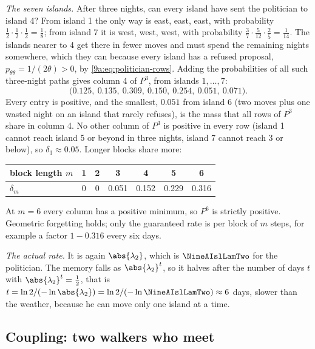 \emph{The seven islands.} After three nights, can every island have sent the politician to
island 4? From island 1 the only way is east, east, east, with probability
$\tfrac12\cdot\tfrac12\cdot\tfrac12=\tfrac18$; from island 7 it is west, west, west, with
probability $\tfrac37\cdot\tfrac5{12}\cdot\tfrac25=\tfrac1{14}$. The islands nearer to 4 get
there in fewer moves and must spend the remaining nights somewhere, which they can because
every island has a refused proposal, $p_{\theta\theta}=1/(2\theta)>0$, by
\eqref{9a:eq:politician-rows}. Adding the probabilities of all such three-night paths gives
column 4 of $P^3$, from islands $1,\dots,7$:
\begin{equation*}
  \bigl(0.125,\ 0.135,\ 0.309,\ 0.150,\ 0.254,\ 0.051,\ 0.071\bigr).
\end{equation*}
Every entry is positive, and the smallest, $0.051$ from island 6 (two moves plus one wasted
night on an island that rarely refuses), is the mass that all rows of $P^3$ share in column 4.
No other column of $P^3$ is positive in every row (island 1 cannot reach island 5 or beyond in
three nights, island 7 cannot reach 3 or below), so $\delta_3\approx0.05$. Longer blocks share
more:
\begin{center}
\small
\begin{tabular}{@{}lcccccc@{}}
  \toprule
  block length $m$ & 1 & 2 & 3 & 4 & 5 & 6\\
  \midrule
  $\delta_m$ & 0 & 0 & 0.051 & 0.152 & 0.229 & 0.316\\
  \bottomrule
\end{tabular}
\end{center}
At $m=6$ every column has a positive minimum, so $P^6$ is strictly positive. Geometric
forgetting holds; only the guaranteed rate is per block of $m$ steps, for example a factor
$1-0.316$ every six days.

\emph{The actual rate.} It is again $\abs{\lambda_2}$, which is $\NineAIslLamTwo$ for the
politician. The memory falls as $\abs{\lambda_2}^t$, so it halves after the number of days $t$ with
$\abs{\lambda_2}^{t}=\tfrac12$, that is $t=\ln2/(-\ln\abs{\lambda_2})=\ln2/(-\ln\NineAIslLamTwo)
\approx6$ days, slower than the weather, because he can move only one island at a time.

\subsection{Coupling: two walkers who meet}
\label{9a:sec:coupling}

